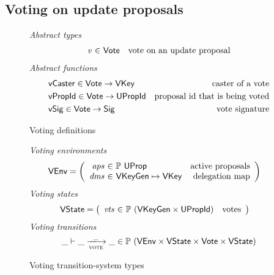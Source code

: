 \clearpage

\subsection{Voting on update proposals}
\label{sec:voting-on-update-proposals}

\begin{figure}[htb]
  \emph{Abstract types}
  \begin{equation*}
    \begin{array}{r@{~\in~}lr}
      \var{v} & \Vote & \text{vote on an update proposal}
    \end{array}
  \end{equation*}
  \emph{Abstract functions}
  \begin{align*}
    & \mathsf{vCaster} \in \mathsf{Vote} \to \mathsf{VKey} & \text{caster of a vote}\\
    & \mathsf{vPropId} \in \mathsf{Vote} \to \mathsf{UPropId} & \text{proposal id that is being voted}\\
    & \mathsf{vSig} \in \mathsf{Vote} \to \mathsf{Sig} & \text{vote signature}
  \end{align*}
  \caption{Voting definitions}
  \label{fig:defs:voting}
\end{figure}

\begin{figure}[htb]
  \emph{Voting environments}
  \begin{align*}
    & \VEnv
      = \left(
      \begin{array}{r@{~\in~}lr}
        \var{aps} & \powerset{\UProp} & \text{active proposals}\\
        \var{dms} & \VKeyGen \mapsto \VKey & \text{delegation map}
      \end{array}\right)
  \end{align*}
  \emph{Voting states}
  \begin{align*}
    & \VState
      = \left(
      \begin{array}{r@{~\in~}lr}
        \var{vts} & \powerset{(\VKeyGen \times \UPropId)} & \text{votes}
      \end{array}\right)
  \end{align*}
  \emph{Voting transitions}
    \begin{equation*}
    \_ \vdash \_ \trans{vote}{\_} \_ \in
    \powerset (\VEnv \times \VState \times \Vote \times \VState)
    \end{equation*}
  \caption{Voting transition-system types}
  \label{fig:ts-types:voting}
\end{figure}

